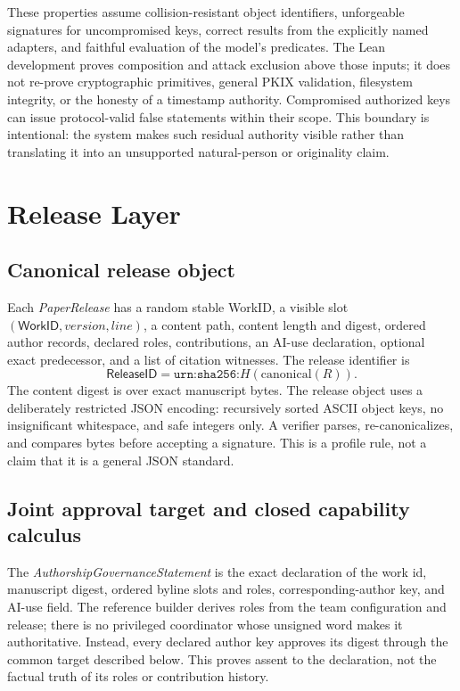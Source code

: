 \documentclass[acmsmall,screen,review,nonacm]{acmart}
\newcommand{\workid}{\textsf{WorkID}}
\newcommand{\releaseid}{\textsf{ReleaseID}}
\begin{document}
These properties assume collision-resistant object identifiers, unforgeable
signatures for uncompromised keys, correct results from the explicitly named
adapters, and faithful evaluation of the model's predicates.  The Lean
development proves composition and attack exclusion above those inputs; it
does not re-prove cryptographic primitives, general PKIX validation, filesystem
integrity, or the honesty of a timestamp authority.  Compromised authorized
keys can issue protocol-valid false statements within their scope.  This
boundary is intentional: the system makes such residual authority visible
rather than translating it into an unsupported natural-person or originality
claim.

\section{Release Layer}

\subsection{Canonical release object}

Each \emph{PaperRelease} has a random stable \workid, a visible slot $(\workid,\textit{version},\textit{line})$, a content path, content length and digest, ordered author records, declared roles, contributions, an AI-use declaration, optional exact predecessor, and a list of citation witnesses. The release identifier is
\[
  \releaseid = \texttt{urn:sha256:}H(\mathrm{canonical}(R)).
\]
The content digest is over exact manuscript bytes. The release object uses a deliberately restricted JSON encoding: recursively sorted ASCII object keys, no insignificant whitespace, and safe integers only. A verifier parses, re-canonicalizes, and compares bytes before accepting a signature. This is a profile rule, not a claim that it is a general JSON standard.

\subsection{Joint approval target and closed capability calculus}

The \emph{AuthorshipGovernanceStatement} is the exact declaration of the work
id, manuscript digest, ordered byline slots and roles, corresponding-author key,
and AI-use field. The reference builder derives roles from the team configuration and release;
there is no privileged coordinator whose unsigned word makes it authoritative.
Instead, every declared author key approves its digest through the common
target described below. This proves assent to the declaration, not the factual
truth of its roles or contribution history.
\end{document}
